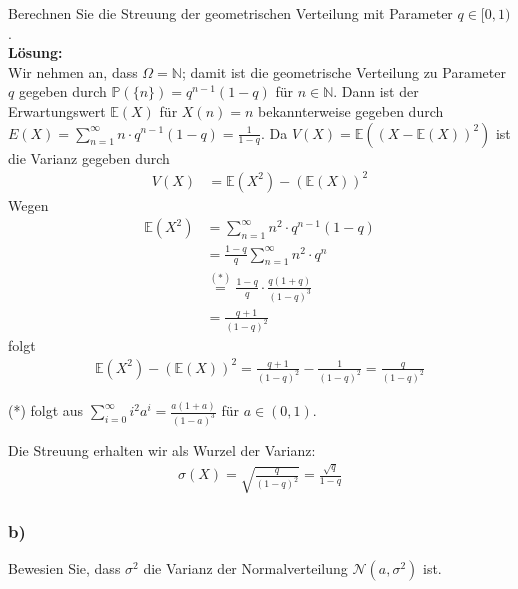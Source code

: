 \documentclass[11pt,a4paper,ngerman]{article}
\newcommand{\set}[1]{ \{ #1 \}}
\newcommand{\Prob}{\mathbb{P}}
\begin{document}
Berechnen Sie die Streuung der geometrischen Verteilung mit Parameter $q \in [0,1)$.\\
\textbf{Lösung:}\\
Wir nehmen an, dass $\Omega = \mathbb{N}$; damit ist die geometrische Verteilung zu Parameter $q$ gegeben durch $\Prob(\set{n}) = q^{n-1}(1-q)$ für $n \in \mathbb{N}$.
Dann ist der Erwartungswert $\mathbb{E}(X)$ für $X(n) = n$ bekannterweise gegeben durch $E(X) = \sum_{n=1}^\infty n \cdot q^{n-1}(1-q) = \frac{1}{1-q}$.
Da $V(X) = \mathbb{E}((X - \mathbb{E}(X))^2)$ ist die Varianz gegeben durch
\begin{equation*}\begin{split}
V(X) &=  \mathbb{E}(X^2) -   (\mathbb{E}(X))^2  
\end{split}\end{equation*}
Wegen
\begin{equation*}\begin{split}
\mathbb{E}(X^2) &=  \sum_{n=1}^\infty n^2 \cdot q^{n-1}(1-q) \\
&= \frac{1-q}{q} \sum_{n=1}^\infty n^2 \cdot q^{n}  \\
&\stackrel{(*)}{=}  \frac{1-q}{q} \cdot \frac{q(1+q)}{(1-q)^3}  \\
&= \frac{q+1}{(1-q)^2}
\end{split}\end{equation*}
folgt
\begin{equation*}\begin{split}
\mathbb{E}(X^2) -   (\mathbb{E}(X))^2  = \frac{q+1}{(1-q)^2} -  \frac{1}{(1-q)^2} = \frac{q}{(1-q)^2}
\end{split}\end{equation*}

(*) folgt aus $\sum_{i=0}^\infty i^2 a^i = \frac{a (1+a)}{(1-a)^3}$ für $a \in (0,1)$.

Die Streuung erhalten wir als Wurzel der Varianz:
\begin{equation*}\begin{split}
\sigma(X) = \sqrt{ \frac{q}{(1-q)^2}} =  \frac{\sqrt{q}}{1-q}
\end{split}\end{equation*}



\subsubsection*{b)}

Bewesien Sie, dass $\sigma^2$ die Varianz der Normalverteilung $\mathcal{N}(a,\sigma^2)$ ist.\\
\end{document}
